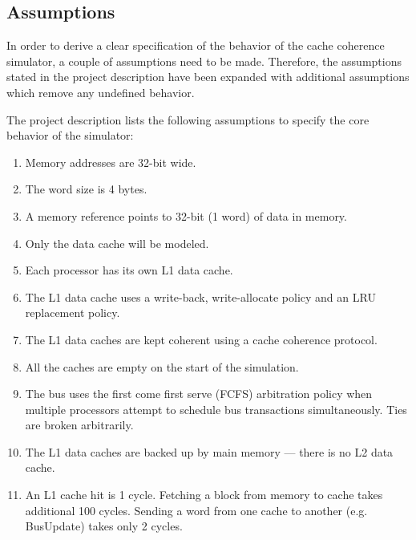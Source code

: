 \subsection{Assumptions}

In order to derive a clear specification of the behavior of the cache coherence simulator, a
couple of assumptions need to be made. Therefore, the assumptions stated in the project description
have been expanded with additional assumptions which remove any undefined behavior.

The project description lists the following assumptions to specify the core behavior of the simulator:
\begin{enumerate}
    \item Memory addresses are 32-bit wide.
    \item The word size is 4 bytes.
    \item A memory reference points to 32-bit (1 word) of data in memory.
    \item Only the data cache will be modeled.
    \item Each processor has its own L1 data cache.
    \item The L1 data cache uses a write-back, write-allocate policy and an LRU replacement policy.
    \item The L1 data caches are kept coherent using a cache coherence protocol.
    \item All the caches are empty on the start of the simulation.
    \item The bus uses the first come first serve (FCFS) arbitration policy when multiple processors
          attempt to schedule bus transactions simultaneously. Ties are broken arbitrarily.
    \item The L1 data caches are backed up by main memory --- there is no L2 data cache.
    \item An L1 cache hit is 1 cycle. Fetching a block from memory to cache takes additional 100 cycles.
          Sending a word from one cache to another (e.g. BusUpdate) takes only 2 cycles.
\end{enumerate}

